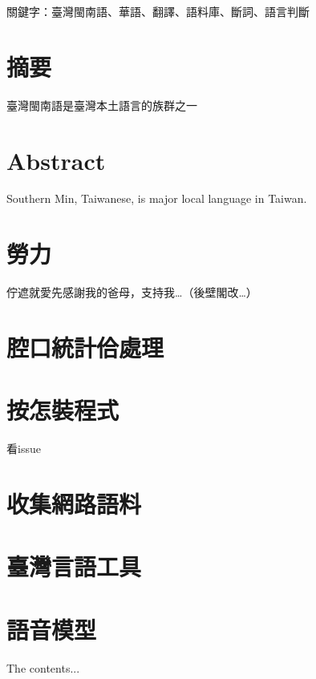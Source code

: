 \documentclass[final,oneside,onecolumn,12pt,a4paper]{book}%
\begin{document}
關鍵字：臺灣閩南語、華語、翻譯、語料庫、斷詞、語言判斷
\newpage

\chapter{摘要}
臺灣閩南語是臺灣本土語言的族群之一

\newpage

\chapter{Abstract}
Southern Min, Taiwanese, is major local language in Taiwan.

\newpage

\chapter{勞力}
佇遮就愛先感謝我的爸母，支持我…（後壁閣改…）

\newpage

\tableofcontents
\listoffigures
\listoftables

\mainmatter











\begin{appendices}
\chapter{腔口統計佮處理}
\label{章：腔口統計佮處理}
\chapter{按怎裝程式}
\label{章：按怎裝程式}
看issue
\chapter{收集網路語料}
\label{章：收集網路語料}
\chapter{臺灣言語工具}
\label{章：臺灣言語工具}
\chapter{語音模型}
\label{章：語音模型}
The contents...
\end{appendices}
\end{document}
